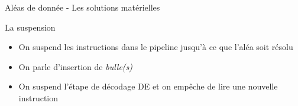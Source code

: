 %
\begin{Frame}{Aléas de donnée - Les solutions matérielles}

  \begin{block}{La suspension}
       \begin{center}
 	\begin{itemize}
          \item On suspend les instructions dans le pipeline jusqu'à ce que l'aléa soit résolu
          \item On parle d'insertion de \emph{bulle(s)} 
	\item On suspend l'étape de décodage DE et on empêche de lire une nouvelle instruction
        \end{itemize}
       \end{center}
      \end{block}   

\vspace{-0.1cm}
        \begin{center}
        \end{center}
 


\end{Frame}



